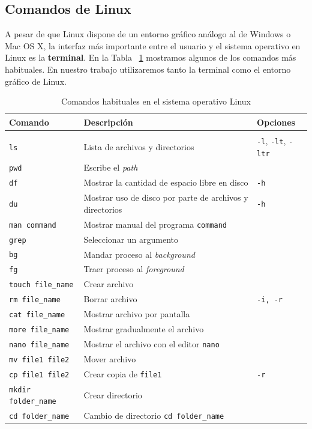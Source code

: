 \documentclass{tufte-book}
\begin{document}
\subsection{Comandos de Linux}
A pesar de que Linux dispone de un entorno gráfico análogo al de 
Windows o Mac OS X, la interfaz más importante entre el usuario y el 
sistema operativo en Linux es la \textbf{terminal}. En la Tabla~
\ref{tb:commands} mostramos algunos de los comandos más habituales.
En nuestro trabajo utilizaremos tanto la terminal como el entorno
gráfico de Linux.

\begin{table}[h!]
\centering
	\scriptsize
	\begin{tabular}{l|l|l}
		Comando & Descripción & Opciones \\
		\hline
		& & \\
		\texttt{ls} & Lista de archivos y directorios & \texttt{-l}, \texttt{-lt}, \texttt{-ltr} \\ 
		\texttt{pwd} & Escribe el \textit{path} & \\ 
		\texttt{df} & Mostrar la cantidad de espacio libre en disco & \texttt{-h}\\ 
		\texttt{du} & Mostrar uso de disco por parte de archivos y directorios & \texttt{-h}\\
		\texttt{man command} & Mostrar manual del programa \texttt{command}  & \texttt{}\\ 
		\texttt{grep} & Seleccionar un argumento  & \texttt{}\\

		\texttt{bg} & Mandar proceso al \textit{background}  & \texttt{}\\ 
		\texttt{fg} & Traer proceso al \textit{foreground}  & \texttt{}\\ 
		\texttt{touch file\_name} & Crear archivo  & \\ 
		\texttt{rm file\_name} & Borrar archivo  & \texttt{-i, -r}\\ 
		\texttt{cat file\_name} & Mostrar archivo por pantalla & \\ 
		\texttt{more file\_name} & Mostrar gradualmente el archivo & \texttt{}\\ 
		\texttt{nano file\_name} & Mostrar el archivo con el editor \texttt{nano}  & \\ 
		\texttt{mv file1 file2} & Mover archivo  & \\ 
		\texttt{cp file1 file2} & Crear copia de \texttt{file1}  & \texttt{-r}\\ 
		\texttt{mkdir folder\_name} & Crear directorio  & \\ 
		\texttt{cd folder\_name} & Cambio de directorio \texttt{cd folder\_name}& \texttt{}\\ 
    \end{tabular}
    \caption{Comandos habituales en el sistema operativo Linux}
    \label{tb:commands}
\end{table}
\end{document}
